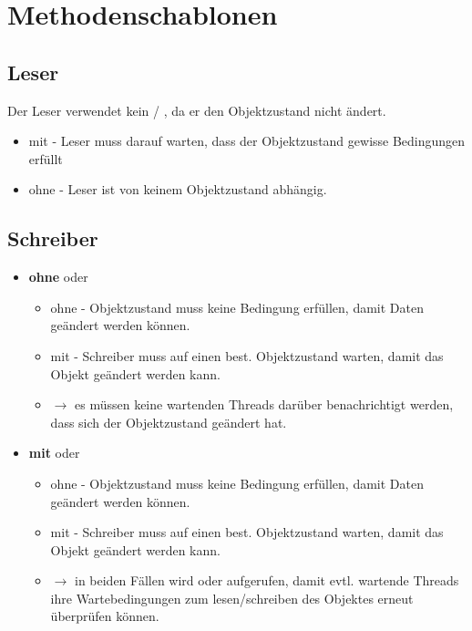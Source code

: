 \section{Methodenschablonen}

\subsection{Leser}

Der Leser verwendet kein  / , da er den Objektzustand nicht ändert.

\begin{itemize}
    \item mit  - Leser muss darauf warten, dass der Objektzustand gewisse Bedingungen erfüllt
    \item ohne  - Leser ist von keinem Objektzustand abhängig.
\end{itemize}


\subsection{Schreiber}

\begin{itemize}
    \item \textbf{ohne}  oder 
    \begin{itemize}
        \item ohne  - Objektzustand muss keine Bedingung erfüllen, damit Daten geändert werden können.
        \item mit  - Schreiber muss auf einen best. Objektzustand warten, damit das Objekt geändert werden kann.
        \item[] $\rightarrow$ es müssen keine wartenden Threads darüber benachrichtigt werden, dass sich der Objektzustand geändert hat.
    \end{itemize}
    \item \textbf{mit}  oder 
    \begin{itemize}
        \item ohne  - Objektzustand muss keine Bedingung erfüllen, damit Daten geändert werden können.
        \item mit  - Schreiber muss auf einen best. Objektzustand warten, damit das Objekt geändert werden kann.
        \item[] $\rightarrow$ in beiden Fällen wird  oder  aufgerufen, damit evtl. wartende Threads ihre Wartebedingungen zum lesen/schreiben des Objektes erneut überprüfen können.
    \end{itemize}

\end{itemize}



